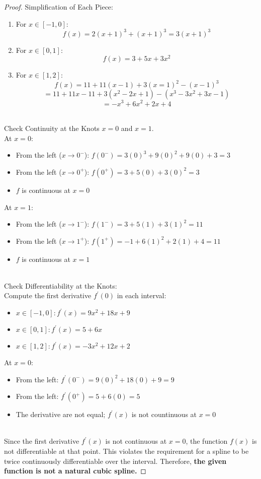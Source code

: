 \documentclass{article}
\begin{document}
\begin{proof}
    Simplification of Each Piece:
    \begin{enumerate}
        \item For $x \in [-1, 0]$:
        \[ f(x) = 2(x + 1)^3 + (x + 1)^3 = 3(x + 1)^3 \]
        \item For $x \in [0, 1]$:
        \[ f(x) = 3 + 5x + 3x^2 \]
        \item For $x \in [1, 2]$:
        \[ f(x) = 11 + 11(x - 1) + 3(x = 1)^2 - (x - 1)^3 \]
        \[ = 11 + 11x -11 + 3(x^2 - 2x + 1) - (x^3 - 3x^2 + 3x - 1) \]
        \[ = -x^3 + 6x^2 + 2x + 4 \]
    \end{enumerate}
    \\
    Check Continuity at the Knots $x = 0$ and $x = 1$.
    \\
    At $x = 0$:
    \begin{itemize}
        \item From the left ($x \rightarrow 0^{-}$): $f(0^{-}) = 3(0)^3 + 9(0)^2 + 9(0) + 3 = 3$
        \item From the left ($x \rightarrow 0^{+}$): $f(0^{+}) = 3 + 5(0) + 3(0)^2 = 3$
        \item $f$ is continuous at $x = 0$
    \end{itemize}
    At $x = 1$:
    \begin{itemize}
        \item From the left ($x \rightarrow 1^{-}$): $f(1^{-}) = 3 + 5(1) + 3(1)^2 = 11$
        \item From the left ($x \rightarrow 1^{+}$): $f(1^{+}) = -1 + 6(1)^2 + 2(1) + 4 = 11$
        \item $f$ is continuous at $x = 1$
    \end{itemize}
    \\
    Check Differentiability at the Knots:
    \\
    Compute the first derivative $f^{'}(0)$ in each interval:
    \begin{itemize}
        \item $x \in [-1, 0]: f^{'}(x) = 9x^2 + 18x + 9$
        \item $x \in [0, 1]: f^{'}(x) = 5 + 6x$
        \item $x \in [1, 2]: f^{'}(x) = -3x^2 + 12x + 2$
    \end{itemize}
    At $x = 0: $
    \begin{itemize}
        \item From the left: $f^{'}(0^{-}) = 9(0)^2 + 18(0) + 9 = 9$
        \item From the left: $f^{'}(0^{+}) = 5 + 6(0) = 5$
        \item The derivative are not equal; $f^{'}(x)$ is not countinuous at $x = 0$
    \end{itemize}
    \\
    Since the first derivative $f^{'}(x)$ is not continuous at $x = 0$, the function $f(x)$ is not differentiable at 
    that point. This violates the requirement for a spline to be twice continuously differentiable over the interval.
    Therefore, \textbf{the given function is not a natural cubic spline.}
\end{proof}
\end{document}
